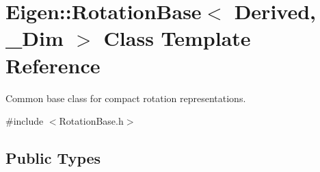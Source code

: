 \hypertarget{class_eigen_1_1_rotation_base}{}\section{Eigen\+:\+:Rotation\+Base$<$ Derived, \+\_\+\+Dim $>$ Class Template Reference}
\label{class_eigen_1_1_rotation_base}


Common base class for compact rotation representations.  




{\ttfamily \#include $<$Rotation\+Base.\+h$>$}

\subsection*{Public Types}
